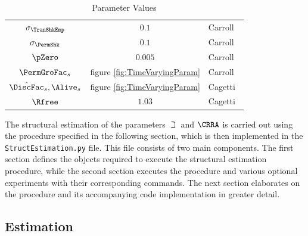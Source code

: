\documentclass[titlepage, headings=optiontotocandhead]{\econtex}
\begin{document}
\begin{table}[h]
  \caption{Parameter Values}\label{table:StrEstParams}
  \begin{center}
    \begin{tabular}{ccl}
      \hline\hline
      $\sigma _{\TranShkEmp}$    & $0.1$ & Carroll~\citeyearpar{carroll:brookings}
      \\ $\sigma _{\PermShk}$   & $0.1$ & Carroll~\citeyearpar{carroll:brookings}
      \\ $\pZero$           & $0.005$  & Carroll~\citeyearpar{carroll:brookings}
      \\ $\PermGroFac_{s}$        & figure \ref{fig:TimeVaryingParam} & Carroll~\citeyearpar{carrollBSLCPIH}
      \\ $\hat{\DiscFac}_{s},\Alive_{s}$ & figure \ref{fig:TimeVaryingParam} & Cagetti~\citeyearpar{cagettiWprofiles}
      \\$\Rfree$            & $1.03$  & Cagetti~\citeyearpar{cagettiWprofiles}\\
      \hline
    \end{tabular}
  \end{center}
\end{table}

The structural estimation of the parameters ${\beth}$ and $\CRRA$ is carried out using
the procedure specified in the following section, which is then implemented in
the \texttt{StructEstimation.py} file. This file consists of two main components. The
first section defines the objects required to execute the structural estimation procedure,
while the second section executes the procedure and various optional
experiments with their corresponding commands. The next section elaborates on the procedure
and its accompanying code implementation in greater detail.

\subsection{Estimation}
\end{document}
